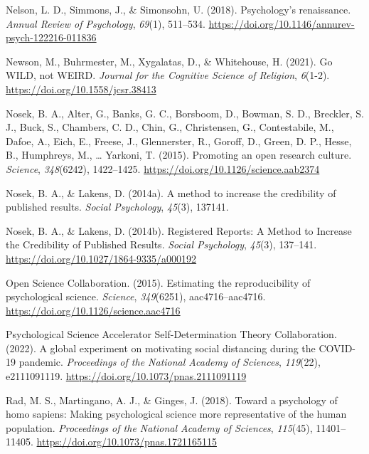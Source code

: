 \documentclass[
  man,floatsintext]{apa7}
\newlength{\cslhangindent}
\newenvironment{CSLReferences}[2] %
 {\begin{list}{}{%
  \setlength{\itemindent}{0pt}
  \setlength{\leftmargin}{0pt}
  \setlength{\parsep}{0pt}
  \ifodd #1
   \setlength{\leftmargin}{\cslhangindent}
   \setlength{\itemindent}{-1\cslhangindent}
  \fi
  \setlength{\itemsep}{#2\baselineskip}}}
 {\end{list}}
\begin{document}
\begin{CSLReferences}{1}{0}
Nelson, L. D., Simmons, J., \& Simonsohn, U. (2018). Psychology's renaissance. \emph{Annual Review of Psychology}, \emph{69}(1), 511--534. \url{https://doi.org/10.1146/annurev-psych-122216-011836}

Newson, M., Buhrmester, M., Xygalatas, D., \& Whitehouse, H. (2021). Go WILD, not WEIRD. \emph{Journal for the Cognitive Science of Religion}, \emph{6}(1-2). \url{https://doi.org/10.1558/jcsr.38413}

Nosek, B. A., Alter, G., Banks, G. C., Borsboom, D., Bowman, S. D., Breckler, S. J., Buck, S., Chambers, C. D., Chin, G., Christensen, G., Contestabile, M., Dafoe, A., Eich, E., Freese, J., Glennerster, R., Goroff, D., Green, D. P., Hesse, B., Humphreys, M., \ldots{} Yarkoni, T. (2015). Promoting an open research culture. \emph{Science}, \emph{348}(6242), 1422--1425. \url{https://doi.org/10.1126/science.aab2374}

Nosek, B. A., \& Lakens, D. (2014a). A method to increase the credibility of published results. \emph{Social Psychology}, \emph{45}(3), 137141.

Nosek, B. A., \& Lakens, D. (2014b). Registered Reports: A Method to Increase the Credibility of Published Results. \emph{Social Psychology}, \emph{45}(3), 137--141. \url{https://doi.org/10.1027/1864-9335/a000192}

Open Science Collaboration. (2015). Estimating the reproducibility of psychological science. \emph{Science}, \emph{349}(6251), aac4716--aac4716. \url{https://doi.org/10.1126/science.aac4716}

Psychological Science Accelerator Self-Determination Theory Collaboration. (2022). A global experiment on motivating social distancing during the COVID-19 pandemic. \emph{Proceedings of the National Academy of Sciences}, \emph{119}(22), e2111091119. \url{https://doi.org/10.1073/pnas.2111091119}

Rad, M. S., Martingano, A. J., \& Ginges, J. (2018). Toward a psychology of homo sapiens: Making psychological science more representative of the human population. \emph{Proceedings of the National Academy of Sciences}, \emph{115}(45), 11401--11405. \url{https://doi.org/10.1073/pnas.1721165115}


\end{CSLReferences}
\end{document}
